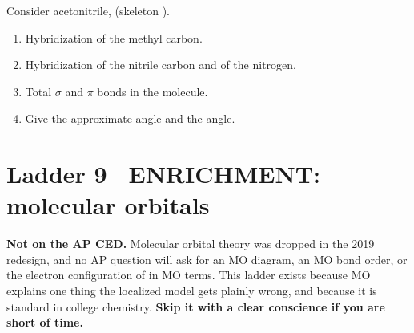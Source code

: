 \documentclass{apchem-worksheet}
\begin{document}
\begin{yourturn}
Consider acetonitrile,  (skeleton ).
\begin{enumerate}[leftmargin=*,itemsep=0.5em]
  \item Hybridization of the methyl carbon. \workspace[1.4cm]
  \item Hybridization of the nitrile carbon and of the nitrogen.
        \workspace[1.6cm]
  \item Total $\sigma$ and $\pi$ bonds in the molecule.
        \workspace[1.6cm]
  \item Give the approximate  angle and the  angle.
        \workspace[1.6cm]
\end{enumerate}
\end{yourturn}

\section*{\sffamily Ladder 9 \textbullet\ ENRICHMENT: molecular orbitals}

\begin{apctrap}
\textbf{Not on the AP CED.} Molecular orbital theory was dropped in the
2019 redesign, and no AP question will ask for an MO diagram, an MO bond
order, or the electron configuration of  in MO terms. This ladder
exists because MO explains one thing the localized model gets plainly
wrong, and because it is standard in college chemistry. \textbf{Skip it
with a clear conscience if you are short of time.}
\end{apctrap}
\end{document}
